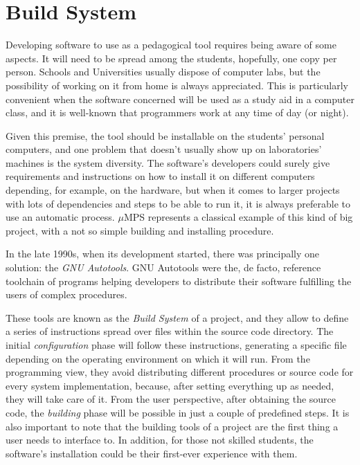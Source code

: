 \documentclass[12pt,a4paper,openright,twoside]{report}
\begin{document}
\section{Build System}
Developing software to use as a pedagogical tool requires being aware of some aspects.
It will need to be spread among the students, hopefully, one copy per person.
Schools and Universities usually dispose of computer labs, but the possibility of working on it from home is always appreciated.
This is particularly convenient when the software concerned will be used as a study aid in a computer class, and it is well-known that programmers work at any time of day (or night).

Given this premise, the tool should be installable on the students' personal computers, and one problem that doesn't usually show up on laboratories' machines is the system diversity.
The software's developers could surely give requirements and instructions on how to install it on different computers depending, for example, on the hardware, but when it comes to larger projects with lots of dependencies and steps to be able to run it, it is always preferable to use an automatic process.
$\mu$MPS represents a classical example of this kind of big project, with a not so simple building and installing procedure.

In the late 1990s, when its development started, there was principally one solution: the \textit{GNU Autotools}.
GNU Autotools were the, de facto, reference toolchain of programs helping developers to distribute their software fulfilling the users of complex procedures.

These tools are known as the \textit{Build System} of a project, and they allow to define a series of instructions spread over files within the source code directory.
The initial \textit{configuration} phase will follow these instructions, generating a specific file depending on the operating environment on which it will run.
From the programming view, they avoid distributing different procedures or source code for every system implementation, because, after setting everything up as needed, they will take care of it.
From the user perspective, after obtaining the source code, the \textit{building} phase will be possible in just a couple of predefined steps.
It is also important to note that the building tools of a project are the first thing a user needs to interface to.
In addition, for those not skilled students, the software's installation could be their first-ever experience with them.
\end{document}
